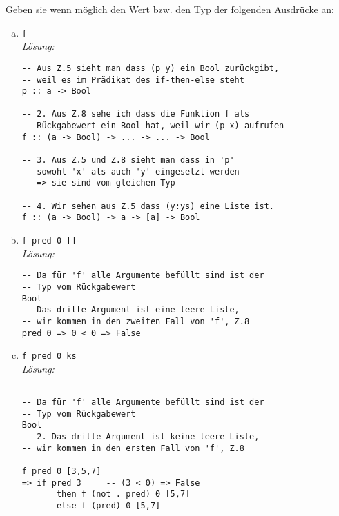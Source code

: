\documentclass{article}
\begin{document}
Geben sie wenn möglich den Wert bzw. den Typ der folgenden Ausdrücke an:

\newpage

\begin{enumerate} [a)]
    \setlength\itemsep{3em}
    \item \texttt{f} \\[2mm]
    \textit{Lösung:}
    \begin{mdframed}[backgroundcolor=bg]
        \begin{verbatim}
-- Aus Z.5 sieht man dass (p y) ein Bool zurückgibt,
-- weil es im Prädikat des if-then-else steht
p :: a -> Bool

-- 2. Aus Z.8 sehe ich dass die Funktion f als
-- Rückgabewert ein Bool hat, weil wir (p x) aufrufen
f :: (a -> Bool) -> ... -> ... -> Bool

-- 3. Aus Z.5 und Z.8 sieht man dass in 'p' 
-- sowohl 'x' als auch 'y' eingesetzt werden
-- => sie sind vom gleichen Typ

-- 4. Wir sehen aus Z.5 dass (y:ys) eine Liste ist.
f :: (a -> Bool) -> a -> [a] -> Bool
        \end{verbatim}
    \end{mdframed}
    \item \texttt{f pred 0 []} \\[2mm]
    \textit{Lösung:}
    \begin{mdframed}[backgroundcolor=bg]
        \begin{verbatim}
-- Da für 'f' alle Argumente befüllt sind ist der
-- Typ vom Rückgabewert
Bool
-- Das dritte Argument ist eine leere Liste,
-- wir kommen in den zweiten Fall von 'f', Z.8
pred 0 => 0 < 0 => False
        \end{verbatim}
    \end{mdframed}

\newpage

    \item \texttt{f pred 0 ks} \\[2mm]
    \textit{Lösung:}
    \begin{mdframed}[backgroundcolor=bg]
        \begin{verbatim}

-- Da für 'f' alle Argumente befüllt sind ist der
-- Typ vom Rückgabewert
Bool
-- 2. Das dritte Argument ist keine leere Liste,
-- wir kommen in den ersten Fall von 'f', Z.8

f pred 0 [3,5,7]
=> if pred 3     -- (3 < 0) => False
       then f (not . pred) 0 [5,7]
       else f (pred) 0 [5,7]


\end{verbatim}
\end{mdframed}
\end{enumerate}
\end{document}

